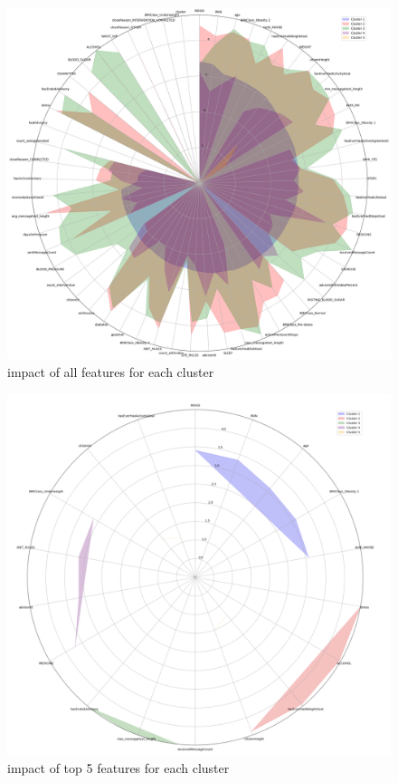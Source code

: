 \documentclass[12pt]{article}
\begin{document}
\begin{figure}[h]
  \centering
  \includegraphics[width=1.0\linewidth]{images/all_feature}
  \caption{impact of all features for each cluster}
  \label{fig:all_features}
  \end{figure}

\newpage

  \begin{figure}[h]
    \centering
    \includegraphics[width=1.0\linewidth]{images/top5_features.png}
    \caption{impact of top 5 features for each cluster}
    \label{fig:top5_features}
\end{figure}
\end{document}
